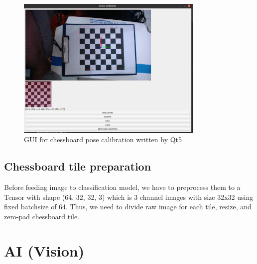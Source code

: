 \documentclass[11pt,fleqn]{book} %
\begin{document}
\begin{figure}
\centering
\includegraphics[width=0.8\textwidth]{GUI_camera}
\caption{\label{fig:GUI_camera}GUI for chessboard pose calibration written by Qt5}
\end{figure}

\subsection{Chessboard tile preparation}
Before feeding image to classification model, we have to preprocess them to a Tensor with shape (64, 32, 32, 3) which is 3 channel images with size 32x32 using fixed batchsize of 64. Thus, we need to divide raw image for each tile, resize, and zero-pad chessboard tile.

\section{AI (Vision)}
\end{document}
